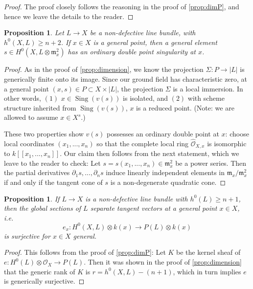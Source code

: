 \documentclass[11pt,reqno]{amsart}
\theoremstyle{plain}
\newtheorem{proposition}[theorem]{Proposition}
\theoremstyle{definition}
\theoremstyle{remark}
\numberwithin{equation}{section}
\DeclareMathOperator{\sing}{Sing}
\newcommand{\cO}{{\mathcal O}}
\renewcommand{\to}{{\longrightarrow}}
\numberwithin{equation}{section}
\begin{document}
\begin{proof}
  The proof closely follows the reasoning in the proof of \autoref{prop:dimP}, and hence we leave the details to the reader.
\end{proof}

\begin{proposition}\label{prop:ordinarydoublepoint}
  Let $L \to X$ be a non-defective line bundle, with $h^{0}(X,L) \geq n+2$. If $x \in X$ is a general point, then a general element $s \in H^{0}(X,L \otimes {\mathfrak{m}}^{2}_{x})$ has an ordinary double point singularity at $x$.
\end{proposition}

\begin{proof}
  As in the proof of \autoref{prop:dimension}, we know  the projection $\Sigma: P \to
  |L|$ is generically finite onto its image. Since our ground field has characteristic
  zero, at a general point $(x,s) \in P \subset X \times |L|$, the projection $\Sigma$ is a local immersion.  In other words, $(1)$  $x \in \sing(v(s))$ is isolated, and $(2)$ with scheme structure inherited from $\sing(v(s))$, $x$ is a reduced point. (Note: we are allowed to assume $x \in X^{s}$.)  

  These two properties show $v(s)$ possesses an ordinary double point at $x$: choose local coordinates $(x_{1}, ..., x_{n})$ so that the complete local ring ${\widehat{\cO}_{X,x}}$ is isomorphic to $k[[x_{1}, ..., x_{n}]]$. Our claim then follows from the next statement, which we leave to the reader to check: Let $s = s(x_{1}, ..., x_{n}) \in {\mathfrak m}^{2}_{x}$ be a power series. Then the partial derivatives $\partial_{1}s, ..., \partial_{n}s$ induce linearly independent elements in ${\mathfrak m}_{x}/{\mathfrak m}^{2}_{x}$ if and only if the tangent cone of $s$ is a non-degenerate quadratic cone.
\end{proof}



\begin{proposition}
  \label{prop:genericSeparateTangents}
  If $L \to X$ is a non-defective line bundle  with $h^{0}(L) \geq n+1$, then the global sections of $L$ separate tangent vectors at a general point $x \in X$, i.e. $$e_{x}: H^{0}(X,L) \otimes k(x) \to P(L) \otimes k(x)$$ is surjective for $x \in X$ general.
\end{proposition}

\begin{proof}

This follows from the proof of \autoref{prop:dimP}: Let $K$ be the kernel sheaf of $e: H^{0}(L) \otimes \cO_{X} \to P(L)$. Then it was shown in the proof of \autoref{prop:dimension} that the generic rank of $K$ is $r = h^{0}(X,L) - (n+1) $, which in turn implies  $e$ is generically surjective.   
\end{proof}
\end{document}
